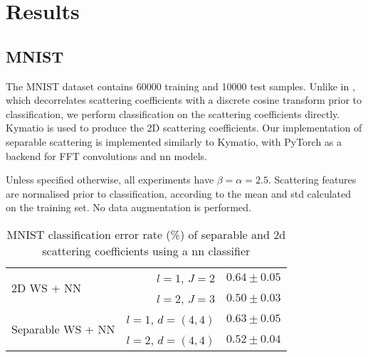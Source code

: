 \documentclass[journal]{IEEEtran}
\begin{document}



\section{Results}



\subsection{MNIST}


The MNIST dataset \cite{mnist} contains 60000 training and 10000 test samples. Unlike in \cite{2dscattering}, which decorrelates scattering coefficients with a discrete cosine transform prior to classification, we perform classification on the scattering coefficients directly. Kymatio \cite{kymatio} is used to produce the 2D scattering coefficients. Our implementation of separable scattering is implemented similarly to Kymatio, with PyTorch \cite{pytorch} as a backend for FFT convolutions and \ac{nn} models.

Unless specified otherwise, all experiments have $\beta = \alpha = 2.5$. Scattering features are normalised prior to classification, according to the mean and \ac{std} calculated on the training set. No data augmentation is performed.

\begin{table}
\centering
\caption{MNIST classification error rate (\%) of separable and \ac{2d} scattering coefficients using a \ac{nn} classifier} \label{tab:mnistnn}
\begin{tabular}{|lr|l|} \hline
\multirow{2}{*}{2D WS + NN}        & $l=1$, $J=2$  & $0.64 \pm 0.05$    \\
          & $l=2$, $J=3$ & $0.50 \pm 0.03$     \\ \hline
\multirow{2}{*}{Separable WS + NN}  & $l=1$, $d=(4,4)$ & $0.63 \pm 0.05 $    \\
          & $l=2$, $d=(4,4)$  & $0.52 \pm 0.04$     \\ \hline
\end{tabular}
\end{table}
\end{document}

